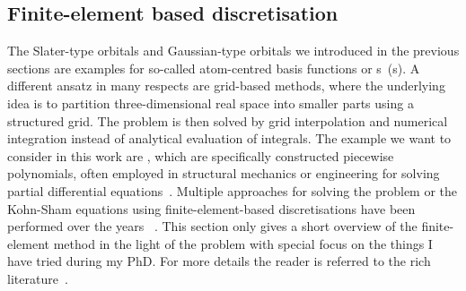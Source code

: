\subsection{Finite-element based discretisation}
\label{sec:FE}
\newcommand{\Nquadc}{\ensuremath N_\text{quadc}}
\newcommand{\Ncell}{\ensuremath N_\text{cell}}

The Slater-type orbitals and Gaussian-type orbitals
we introduced in the previous sections
are examples for so-called atom-centred basis functions
or s~({\ACO}s).
A different ansatz in many respects
are grid-based methods,
where the underlying idea is to partition three-dimensional real space
into smaller parts using a structured grid.
The problem is then solved by grid interpolation and numerical integration
instead of analytical evaluation of integrals.
The example we want to consider in this work are ,
which are specifically constructed piecewise polynomials,
often employed in structural mechanics or engineering
for solving partial differential equations~\cite{Johnson1987}.
Multiple approaches for
solving the \HF problem or the Kohn-Sham equations
using finite-element-based discretisations
have been performed over the years%
~\cite{Tsuchida1995,Soler2002,Lehtovaara2009,Alizadegan2010,Avery2011PhD,Davydov2015,Lee2015,Boffi2016}.
This section only gives a short overview of the finite-element method
in the light of the \HF problem
with special focus on the things I have tried during my PhD.
For more details the reader is referred
to the rich literature~\cite{Johnson1987,Grossmann1992,Bangerth2003,Brenner2008}.


